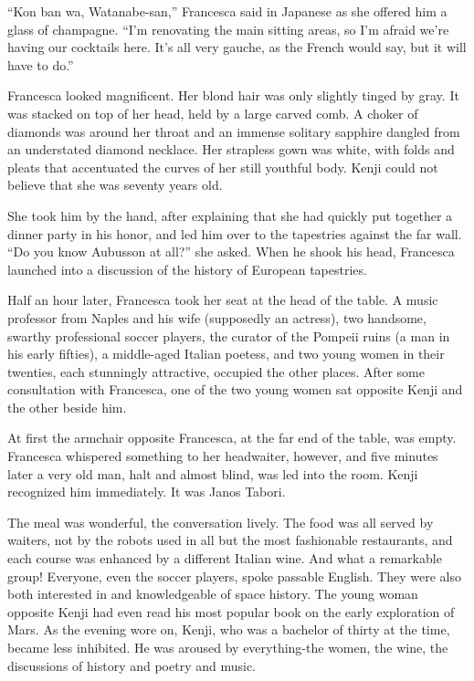 \documentclass[]{article}
\begin{document}
{“Kon ban wa, Watanabe-san,” Francesca said in Japanese as she offered him a glass of champagne. “I’m renovating the main sitting areas, so I’m afraid we’re having our cocktails here. It’s all very gauche, as the French would say, but it will have to do.”

Francesca looked magnificent. Her blond hair was only slightly tinged by gray. It was stacked on top of her head, held by a large carved comb. A choker of diamonds was around her throat and an immense solitary sapphire dangled from an understated diamond necklace. Her strapless gown was white, with folds and pleats that accentuated the curves of her still youthful body. Kenji could not believe that she was seventy years old.

She took him by the hand, after explaining that she had quickly put together a dinner party in his honor, and led him over to the tapestries against the far wall. “Do you know Aubusson at all?” she asked. When he shook his head, Francesca launched into a discussion of the history of European tapestries.

Half an hour later, Francesca took her seat at the head of the table. A music professor from Naples and his wife (supposedly an actress), two handsome, swarthy professional soccer players, the curator of the Pompeii ruins (a man in his early fifties), a middle-aged Italian poetess, and two young women in their twenties, each stunningly attractive, occupied the other places. After some consultation with Francesca, one of the two young women sat opposite Kenji and the other beside him.

At first the armchair opposite Francesca, at the far end of the table, was empty. Francesca whispered something to her headwaiter, however, and five minutes later a very old man, halt and almost blind, was led into the room. Kenji recognized him immediately. It was Janos Tabori.

The meal was wonderful, the conversation lively. The food was all served by waiters, not by the robots used in all but the most fashionable restaurants, and each course was enhanced by a different Italian wine. And what a remarkable group! Everyone, even the soccer players, spoke passable English. They were also both interested in and knowledgeable of space history. The young woman opposite Kenji had even read his most popular book on the early exploration of Mars. As the evening wore on, Kenji, who was a bachelor of thirty at the time, became less inhibited. He was aroused by everything-the women, the wine, the discussions of history and poetry and music.

}
\end{document}
